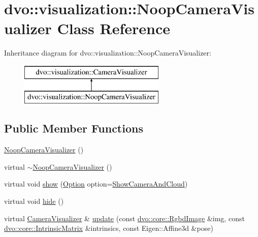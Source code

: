 \hypertarget{classdvo_1_1visualization_1_1_noop_camera_visualizer}{}\section{dvo\+:\+:visualization\+:\+:Noop\+Camera\+Visualizer Class Reference}
\label{classdvo_1_1visualization_1_1_noop_camera_visualizer}
Inheritance diagram for dvo\+:\+:visualization\+:\+:Noop\+Camera\+Visualizer\+:\begin{figure}[H]
\begin{center}
\leavevmode
\includegraphics[height=2.000000cm]{classdvo_1_1visualization_1_1_noop_camera_visualizer}
\end{center}
\end{figure}
\subsection*{Public Member Functions}
\begin{DoxyCompactItemize}
\item 
\mbox{\hyperlink{classdvo_1_1visualization_1_1_noop_camera_visualizer_ade3cb140e752ade11e25f0ad049958af}{Noop\+Camera\+Visualizer}} ()
\item 
virtual \mbox{\hyperlink{classdvo_1_1visualization_1_1_noop_camera_visualizer_ae29e589ff8c183b11c1d2ac8e6072447}{$\sim$\+Noop\+Camera\+Visualizer}} ()
\item 
virtual void \mbox{\hyperlink{classdvo_1_1visualization_1_1_noop_camera_visualizer_acfb97efacfcb9e3dd30444e34c7bfd9c}{show}} (\mbox{\hyperlink{classdvo_1_1visualization_1_1_camera_visualizer_a0526f50be9f298c4f7d1f91018d50af7}{Option}} option=\mbox{\hyperlink{classdvo_1_1visualization_1_1_camera_visualizer_a0526f50be9f298c4f7d1f91018d50af7a0ff8fc7d7283f27066e93ca0d4ef3f19}{Show\+Camera\+And\+Cloud}})
\item 
virtual void \mbox{\hyperlink{classdvo_1_1visualization_1_1_noop_camera_visualizer_a875ff591e3db513ddbec48478989639e}{hide}} ()
\item 
virtual \mbox{\hyperlink{classdvo_1_1visualization_1_1_camera_visualizer}{Camera\+Visualizer}} \& \mbox{\hyperlink{classdvo_1_1visualization_1_1_noop_camera_visualizer_a7983d8de9de45c5617c3e877d36d6ff3}{update}} (const \mbox{\hyperlink{structdvo_1_1core_1_1_rgbd_image}{dvo\+::core\+::\+Rgbd\+Image}} \&img, const \mbox{\hyperlink{structdvo_1_1core_1_1_intrinsic_matrix}{dvo\+::core\+::\+Intrinsic\+Matrix}} \&intrinsics, const Eigen\+::\+Affine3d \&pose)
\end{DoxyCompactItemize}
